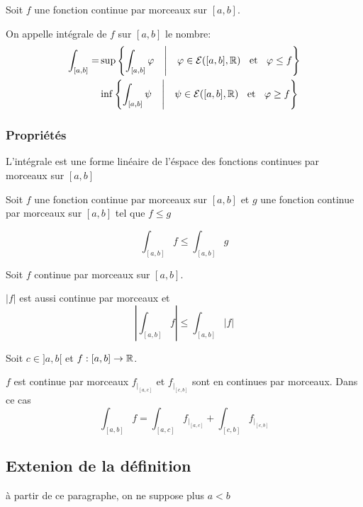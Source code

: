 \begin{dfn}
Soit $f$ une fonction continue par morceaux sur $[a, b]$.

On appelle intégrale de $f$ sur $[a, b]$ le nombre:
\begin{align*}
    \int_{[a, b]} =
        &\sup \left\{ \int_{[a, b]} \varphi \quad \middle| \quad \varphi \in
        \mathcal{E}([a, b], \mathbb{R}) \;\;\text{ et }\;\; \varphi \leq f \right\} \\
        &\inf \left\{ \int_{[a, b]} \psi \quad \middle| \quad \psi \in
        \mathcal{E}([a, b], \mathbb{R}) \;\;\text{ et }\;\; \varphi \geq f \right\}
\end{align*}
\end{dfn}

\subsubsection{Propriétés}

\begin{prp}
L'intégrale est une forme linéaire de l'éspace des fonctions continues
par morceaux sur $[a, b]$
\end{prp}

\begin{prp}
Soit $f$ une fonction continue par morceaux sur $[a, b]$ et $g$ une
fonction continue par morceaux sur $[a, b]$ tel que $f \leq g$

\[
    \int_{[a, b]} f \leq \int_{[a, b]} g
\]
\end{prp}

\begin{prp}
Soit $f$ continue par morceaux sur $[a, b]$.

$|f|$ est aussi continue par morceaux et
\[
    |\int_{[a, b]} f| \leq \int_{[a, b]} |f|
\]
\end{prp}

\begin{prp}
Soit $c \in ]a, b[$ et $f : [a, b] \to \mathbb{R}$.

$f$ est continue par morceaux \ssi $f_{|_{[a, c]}}$ et $f_{|_{[c, b]}}$
sont en continues par morceaux.
Dans ce cas
\[
    \int_{[a, b]} f = \int_{[a, c]} f_{|_{[a, c]}}
        + \int_{[c, b]} f_{|_{[c, b]}}
\]
\end{prp}

\subsection{Extenion de la définition}

à partir de ce paragraphe, on ne suppose plus $a < b$

